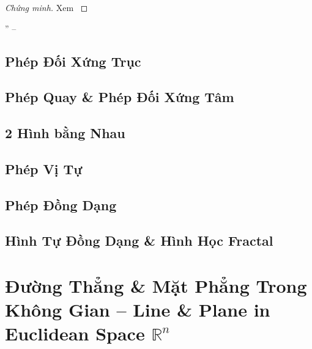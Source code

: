 \documentclass[oneside]{book}
\numberwithin{equation}{section}
\begin{document}
\begin{proof}[Chứng minh]
	Xem \cite[p. 7]{TL_chuyen_Toan_Hinh_Hoc_11}
\end{proof}

'' -- \cite[pp. 7--]{TL_chuyen_Toan_Hinh_Hoc_11}


\section{Phép Đối Xứng Trục}


\section{Phép Quay \& Phép Đối Xứng Tâm}


\section{2 Hình bằng Nhau}


\section{Phép Vị Tự}


\section{Phép Đồng Dạng}


\section{Hình Tự Đồng Dạng \& Hình Học Fractal}


\chapter{Đường Thẳng \& Mặt Phẳng Trong Không Gian -- Line \& Plane in Euclidean Space $\mathbb{R}^n$}
\end{document}
